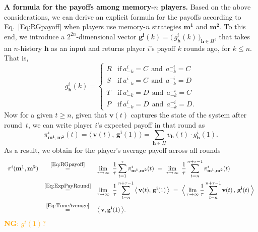 \documentclass[11pt]{article}
\newcommand{\nikoleta}[1]{\textcolor{orange}{\textbf{NG}: #1}}
\theoremstyle{plainCl1}
\theoremstyle{plainCl2}
\begin{document}
\noindent
{\bf A formula for the payoffs among memory-$n$ players.} Based on the above considerations, we can derive an explicit formula for the payoffs according to Eq.~\eqref{Eq:RGpayoff} when players use memory-$n$ strategies $\mathbf{m^1}$ and $\mathbf{m^2}$. 
To this end, we introduce a $2^{2n}$-dimensional vector $\mathbf{g^i}(k)\!=\!\big(\,g^i_\mathbf{h}(k)\,\big)_{\mathbf{h}\in H}$, that takes an $n$-history $\mathbf{h}$ as an input and returns player $i$'s payoff $k$ rounds ago, for $k\!\le\!n$. 
That is, 
\begin{equation}\label{Eq:g(k)}
    g_\mathbf{h}^i(k) = \left\{
    \begin{array}{cl}
    R	&\text{if}~ a_{-k}^i\!=\!C~~\text{and}~~a_{-k}^{-i}\!=\!C\\[0.1cm]
    S	&\text{if}~ a_{-k}^i\!=\!C~~\text{and}~~ a_{-k}^{-i}\!=\!D\\[0.1cm]
    T	&\text{if}~ a_{-k}^i\!=\!D~~\text{and}~~ a_{-k}^{-i}\!=\!C\\[0.1cm]
    P	&\text{if}~ a_{-k}^i\!=\!D~~\text{and}~~ a_{-k}^{-i}\!=\!D.
    \end{array}
    \right.
\end{equation}
Now for a given $t\!\ge\!n$, given that  $\mathbf{v}(t)$ captures the state of the system after round~$t$, we can write player $i$'s expected payoff in that round as
\begin{equation} \label{Eq:ExpPayRound}
\pi^i_{\mathbf{m^1},\mathbf{m^2}}(t) = \big\langle \,\mathbf{v}(t),\, \mathbf{g^i}(1)\,\big\rangle = \sum_{\mathbf{h}\in H} v_\mathbf{h}(t) \cdot g^i_\mathbf{h}(1). 
\end{equation}
As a result, we obtain for the player's average payoff across all rounds
\begin{equation} \label{Eq:PayoffMemoryn}
\begin{array}{rcl}
\pi^i(\mathbf{m^1},\mathbf{m^2}) 
&\stackrel{\mbox{\small \eqref{Eq:RGpayoff}}}{=}  
&\displaystyle \lim_{\tau \to \infty}~ \frac{1}{\tau} \sum_{t=1}^{\tau} \pi^i_{\mathbf{m^1},\mathbf{m^2}}(t)
~=~
\lim_{\tau \to \infty}~ \frac{1}{\tau} \sum_{t=n}^{n+\tau-1} \pi^i_{\mathbf{m^1},\mathbf{m^2}}(t)\\[0.5cm]
&\stackrel{\mbox{\small \eqref{Eq:ExpPayRound}}}{=}  
&\displaystyle \lim_{\tau \to \infty}~ \frac{1}{\tau} \sum_{t=n}^{n+\tau-1}\big\langle \,\mathbf{v}(t),\, \mathbf{g^i}(1)\,\big\rangle
~=~
\Big\langle \lim_{\tau \to \infty} \frac{1}{\tau} \sum_{t=n}^{n+\tau-1} \mathbf{v}(t)\, , \, \mathbf{g^i}(t)\,\Big\rangle\\[0.5cm]
&\stackrel{\mbox{\small \eqref{Eq:TimeAverage}}}{=}  
&\big\langle\, \mathbf{v}, \mathbf{g^i}(1)\,\big\rangle .
\end{array}
\end{equation}
\nikoleta{$g^{i}(1)$?} \\
\end{document}
